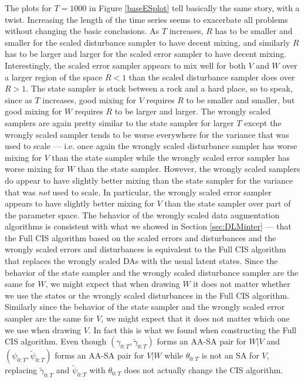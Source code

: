 \documentclass{article}
\begin{document}
The plots for $T=1000$ in Figure \ref{baseESplot} tell basically the same story, with a twist. Increasing the length of the time series seems to exacerbate all problems without changing the basic conclusions. As $T$ increases, $R$ has to be smaller and smaller for the scaled disturbance sampler to have decent mixing, and similarly $R$ has to be larger and larger for the scaled error sampler to have decent mixing. Interestingly, the scaled error sampler appears to mix well for both $V$ and $W$ over a larger region of the space $R<1$ than the scaled disturbance sampler does over $R>1$. The state sampler is stuck between a rock and a hard place, so to speak, since as $T$ increases, good mixing for $V$ requires $R$ to be smaller and smaller, but good mixing for $W$ requires $R$ to be larger and larger. The wrongly scaled samplers are again pretty similar to the state sampler for larger $T$ except the wrongly scaled sampler tends to be worse everywhere for the variance that was used to scale --- i.e. once again the wrongly scaled disturbance sampler has worse mixing for $V$ than the state sampler while the wrongly scaled error sampler has worse mixing for $W$ than the state sampler. However, the wrongly scaled samplers do appear to have slightly better mixing than the state sampler for the variance that was {\it not} used to scale. In particular, the wrongly scaled error sampler appears to have slightly better mixing for $V$ than the state sampler over part of the parameter space. 
The behavior of the wrongly scaled data augmentation algorithms is consistent with what we showed in Section \ref{sec:DLMinter} --- that the Full CIS algorithm based on the scaled errors and disturbances and the wrongly scaled errors and disturbances is equivalent to the Full CIS algorithm that replaces the wrongly scaled DAs with the usual latent states. Since the behavior of the state sampler and the wrongly scaled disturbance sampler are the same for $W$, we might expect that when drawing $W$ it does not matter whether we use the states or the wrongly scaled disturbances in the Full CIS algorithm. Similarly since the behavior of the state sampler and the wrongly scaled error sampler are the same for $V$, we might expect that it does not matter which one we use when drawing $V$. In fact this is what we found when constructing the Full CIS algorithm. Even though $(\gamma_{0:T}, \tilde{\gamma}_{0:T})$ forms an AA-SA pair for $W|V$ and $(\psi_{0:T},\tilde{\psi}_{0:T})$ forms an AA-SA pair for $V|W$ while $\theta_{0:T}$ is not an SA for $V$, replacing $\tilde{\gamma}_{0:T}$ and $\tilde{\psi}_{0:T}$ with $\theta_{0:T}$ does not actually change the CIS algorithm.
\end{document}
